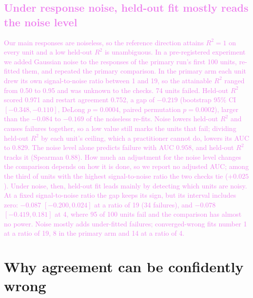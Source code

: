 \documentclass[10pt]{article}
\newcommand{\draft}[1]{\textcolor{violet}{#1}}
\begin{document}
\subsection{\draft{Under response noise, held-out fit mostly reads the noise level}}
\label{sec:noise}
\draft{Our main responses are noiseless, so the reference direction attains $R^2 = 1$ on every
unit and a low held-out $R^2$ is unambiguous. In a pre-registered experiment we added Gaussian
noise to the responses of the primary run's first 100 units, re-fitted them, and repeated the
primary comparison. In the primary arm each unit drew its own signal-to-noise ratio between 1
and 19, so the attainable $R^2$ ranged from 0.50 to 0.95 and was unknown to the checks. 74 units
failed. Held-out $R^2$ scored 0.971 and restart agreement 0.752, a gap of $-0.219$ (bootstrap
95\% CI $[-0.348,-0.110]$, DeLong $p = 0.0004$, paired permutation $p = 0.0002$), larger than the
$-0.084$ to $-0.169$ of the noiseless re-fits. Noise lowers held-out $R^2$ and causes failures
together, so a low value still marks the units that fail; dividing held-out $R^2$ by each unit's
ceiling, which a practitioner cannot do, lowers its AUC to 0.829. The noise level alone
predicts failure with AUC 0.958, and held-out $R^2$ tracks it (Spearman 0.88). How much an
adjustment for the noise level changes the comparison depends on how it is done, so we report no
adjusted AUC; among the third of units with the highest signal-to-noise ratio the two checks tie
($+0.025$). Under noise, then, held-out fit leads mainly by detecting which units are noisy. At a
fixed signal-to-noise ratio the gap keeps its sign, but its interval includes zero: $-0.087$
$[-0.200, 0.024]$ at a ratio of 19 (34 failures), and $-0.078$ $[-0.419, 0.181]$ at 4, where 95 of 100 units fail and the
comparison has almost no power. Noise mostly adds under-fitted failures; converged-wrong fits
number 1 at a ratio of 19, 8 in the primary arm and 14 at a ratio of 4.}

\section{Why agreement can be confidently wrong}
\label{sec:why}
\end{document}
